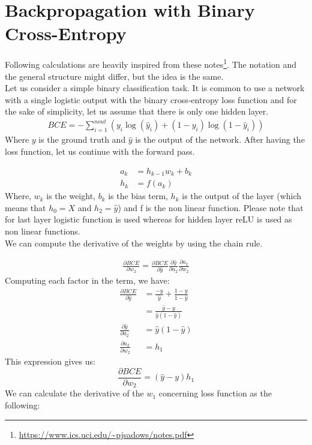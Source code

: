 \documentclass[a4paper, nobind]{templates/ociamthesis}
\begin{document}
\startappendices

\hypertarget{chap:appendix_a}{%
\chapter{Backpropagation with Binary Cross-Entropy}\label{chap:appendix_a}}

Following calculations are heavily inspired from these notes\footnote{\url{https://www.ics.uci.edu/~pjsadows/notes.pdf}}. The notation and the general structure might differ, but the idea is the same.\\
Let us consider a simple binary classification task. It is common to use a network with a single logistic output with the binary cross-entropy loss function and for the sake of simplicity, let us assume that there is only one hidden layer.
\[
\begin{aligned}
BCE=-\sum_{i=1}^{n o u t}\left(y_i \log \left(\hat{y}_i \right)+\left(1-y_i\right) \log \left(1-\hat{y}_i\right)\right)
\end{aligned}
\]
\noindent Where \(y\) is the ground truth and \(\hat{y}\) is the output of the network. After having the loss function, let us continue with the forward pass.

\[
\begin{aligned} 
a_{k} &= h_{k-1} w_{k} + b_k \\
h_k &= f(a_{k})
\end{aligned}
\]
\noindent Where, \(w_k\) is the weight, \(b_{k}\) is the bias term, \(h_k\) is the output of the layer (which means that \(h_0 = X\) and \(h_2 = \hat{y}\)) and f is the non linear function. Please note that for last layer logistic function is used whereas for hidden layer reLU is used as non linear functions.\\
We can compute the derivative of the weights by using the chain rule.

\[
\begin{aligned} 
\frac{\partial BCE}{\partial w_{2}}=\frac{\partial BCE}{\partial \hat{y}} \frac{\partial \hat{y}}{\partial a_{2}} \frac{\partial a_{2}}{\partial w_{2}}
\end{aligned}
\]
\noindent Computing each factor in the term, we have:
\[
\begin{aligned}
\frac{\partial BCE}{\partial \hat{y}} &=\frac{-y}{\hat{y}}+\frac{1-y}{1-\hat{y}} \\
&=\frac{\hat{y}-y}{\hat{y}\left(1-\hat{y}\right)} \\
\frac{\partial \hat{y}}{\partial a_{2}} &=\hat{y}\left(1-\hat{y}\right) \\
\frac{\partial a_{2}}{\partial w_{2}} &=h_{1}
\end{aligned}
\]
This expression gives us:
\[
\frac{\partial BCE}{\partial w_{2}}=\left(\hat{y}-y\right)h_{1}
\]
We can calculate the derivative of the \(w_1\) concerning loss function as the following:
\end{document}
